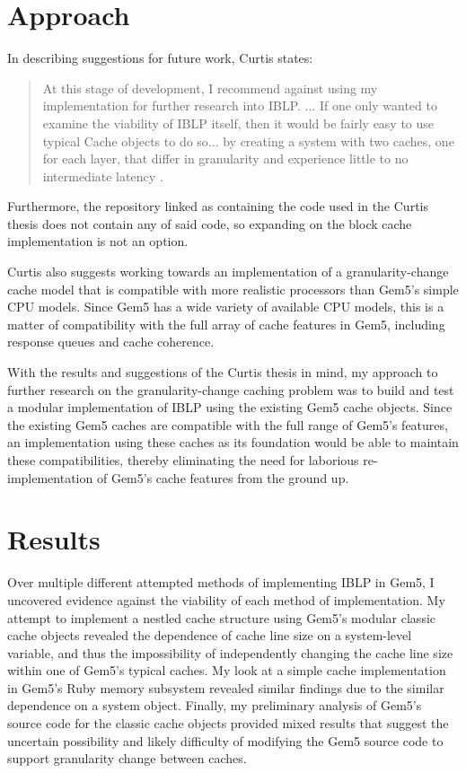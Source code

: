 \documentclass[12pt,twoside]{reedthesis}
\begin{document}
\section{Approach}

	In describing suggestions for future work, Curtis states: \begin{quote}
		At this stage of development, I recommend against using my implementation for further research into IBLP. ... If one only wanted to examine the viability of IBLP itself, then it would be fairly easy to use typical Cache objects to do so... by creating a system with two caches, one for each layer, that differ in granularity and experience little to no intermediate latency \cite{curtis}.
	\end{quote}

	Furthermore, the repository linked as containing the code used in the Curtis thesis does not contain any of said code, so expanding on the block cache implementation is not an option.

	Curtis also suggests working towards an implementation of a granularity-change cache model that is compatible with more realistic processors than Gem5's simple CPU models. Since Gem5 has a wide variety of available CPU models, this is a matter of compatibility with the full array of cache features in Gem5, including response queues and cache coherence.

	With the results and suggestions of the Curtis thesis in mind, my approach to further research on the granularity-change caching problem was to build and test a modular implementation of IBLP using the existing Gem5 cache objects. Since the existing Gem5 caches are compatible with the full range of Gem5's features, an implementation using these caches as its foundation would be able to maintain these compatibilities, thereby eliminating the need for laborious re-implementation of Gem5's cache features from the ground up.

\section{Results}

Over multiple different attempted methods of implementing IBLP in Gem5, I uncovered evidence against the viability of each method of implementation. My attempt to implement a nestled cache structure using Gem5's modular classic cache objects revealed the dependence of cache line size on a system-level variable, and thus the impossibility of independently changing the cache line size within one of Gem5's typical caches. My look at a simple cache implementation in Gem5's Ruby memory subsystem revealed similar findings due to the similar dependence on a system object. Finally, my preliminary analysis of Gem5's source code for the classic cache objects provided mixed results that suggest the uncertain possibility and likely difficulty of modifying the Gem5 source code to support granularity change between caches.
\end{document}
